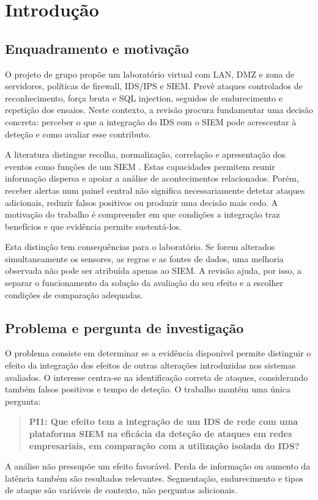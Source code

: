 \documentclass[11pt,a4paper]{article}
\begin{document}
\section{Introdução}
\subsection{Enquadramento e motivação}
O projeto de grupo propõe um laboratório virtual com LAN, DMZ e zona de servidores, políticas de firewall, IDS/IPS e SIEM. Prevê ataques controlados de reconhecimento, força bruta e SQL injection, seguidos de endurecimento e repetição dos ensaios. Neste contexto, a revisão procura fundamentar uma decisão concreta: perceber o que a integração do IDS com o SIEM pode acrescentar à deteção e como avaliar esse contributo.

A literatura distingue recolha, normalização, correlação e apresentação dos eventos como funções de um SIEM \citep{gonzalez2021}. Estas capacidades permitem reunir informação dispersa e apoiar a análise de acontecimentos relacionados. Porém, receber alertas num painel central não significa necessariamente detetar ataques adicionais, reduzir falsos positivos ou produzir uma decisão mais cedo. A motivação do trabalho é compreender em que condições a integração traz benefícios e que evidência permite sustentá-los.

Esta distinção tem consequências para o laboratório. Se forem alterados simultaneamente os sensores, as regras e as fontes de dados, uma melhoria observada não pode ser atribuída apenas ao SIEM. A revisão ajuda, por isso, a separar o funcionamento da solução da avaliação do seu efeito e a escolher condições de comparação adequadas.

\subsection{Problema e pergunta de investigação}
O problema consiste em determinar se a evidência disponível permite distinguir o efeito da integração dos efeitos de outras alterações introduzidas nos sistemas avaliados. O interesse centra-se na identificação correta de ataques, considerando também falsos positivos e tempo de deteção. O trabalho mantém uma única pergunta:
\begin{quote}
\textbf{PI1: Que efeito tem a integração de um IDS de rede com uma plataforma SIEM na eficácia da deteção de ataques em redes empresariais, em comparação com a utilização isolada do IDS?}
\end{quote}
A análise não pressupõe um efeito favorável. Perda de informação ou aumento da latência também são resultados relevantes. Segmentação, endurecimento e tipos de ataque são variáveis de contexto, não perguntas adicionais.
\end{document}
